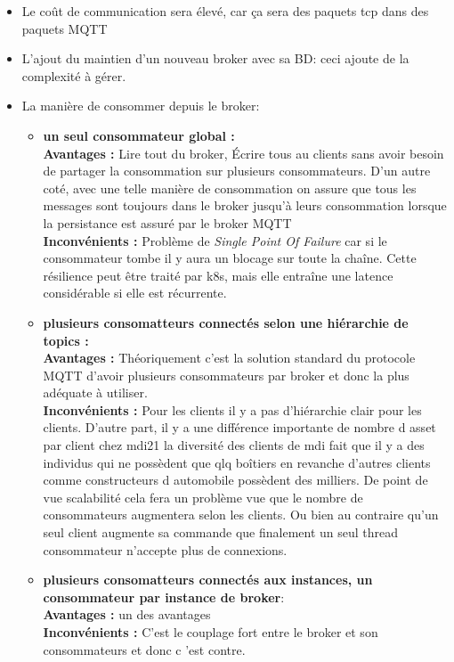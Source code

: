     \begin{itemize}
        \renewcommand{\labelitemi}{$\bullet$}
        \item Le coût de communication sera élevé, car ça sera des paquets tcp dans des paquets MQTT 
        \item L'ajout du maintien d’un nouveau broker avec sa BD: ceci ajoute de la complexité à gérer.
        \item La manière de consommer depuis le broker: 
        \begin{itemize}
            \item \textbf{un seul consommateur global :} \\
            \textbf{Avantages :} Lire tout du broker, Écrire tous au clients sans avoir besoin de partager la consommation 
            sur plusieurs consommateurs. D'un autre coté, avec une telle manière de consommation on assure que tous les messages 
            sont toujours dans le broker jusqu'à leurs consommation lorsque la persistance est assuré par le broker MQTT\\
            \textbf{Inconvénients :} Problème de \textit{Single Point Of Failure} car si le consommateur tombe il y aura un blocage sur toute 
            la chaîne. Cette résilience peut être traité par \gls{k8s}, mais elle entraîne une latence considérable si elle est récurrente. 
            \item \textbf{plusieurs consomatteurs connectés selon une hiérarchie de topics :} \\
            \textbf{Avantages :} Théoriquement c'est la solution standard du protocole MQTT d'avoir plusieurs consommateurs 
                    par broker et donc la plus adéquate à utiliser. \\
            \textbf{Inconvénients :} Pour les clients il y a pas d'hiérarchie clair pour les clients. 
                    D'autre part, il y a une différence importante de nombre d asset par client chez \gls{mdi21} 
                    la diversité des clients de \gls{mdi} fait que il y a des individus qui ne possèdent que qlq boîtiers 
                    en revanche d'autres clients comme constructeurs d automobile possèdent des milliers. De point de vue 
                    scalabilité cela fera un problème vue que le nombre de consommateurs augmentera selon les clients.
                    Ou bien au contraire qu'un seul client augmente sa commande que finalement un seul thread consommateur 
                    n'accepte plus de connexions.
            \item \textbf{plusieurs consomatteurs connectés aux instances, un consommateur par instance de broker}: \\
            \textbf{Avantages :} un des avantages \\
            \textbf{Inconvénients :} C'est le couplage fort entre le broker et son consommateurs et donc c 'est contre.\\
        \end{itemize}
    \end{itemize}


